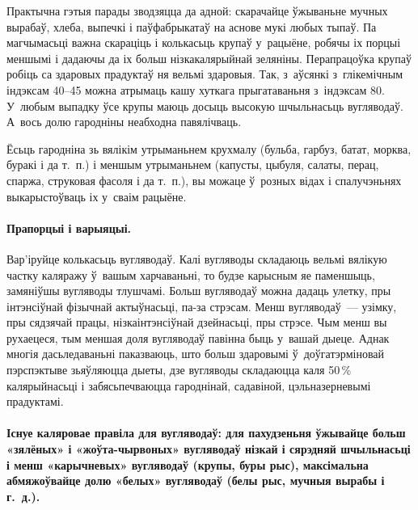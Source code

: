 
Практычна гэтыя парады зводзяцца да адной: скарачайце ўжываньне мучных вырабаў, хлеба, выпечкі і паўфабрыкатаў на аснове мукі любых тыпаў. Па магчымасьці важна скараціць і колькасьць крупаў у~рацыёне, робячы іх порцыі меншымі і дадаючы да іх больш нізкакалярыйнай зеляніны. Перапрацоўка крупаў робіць са здаровых прадуктаў ня вельмі здаровыя. Так, з~аўсянкі з~глікемічным індэксам 40--45 можна атрымаць кашу хуткага прыгатаваньня з~індэксам 80. У~любым выпадку ўсе крупы маюць досыць высокую шчыльнасьць вугляводаў. А~вось долю гародніны неабходна павялічваць.

Ёсьць гародніна зь вялікім утрыманьнем крухмалу (бульба, гарбуз, батат, морква, буракі і да т.~п.) і меншым утрыманьнем (капусты, цыбуля, салаты, перац, спаржа, струковая фасоля і да т.~п.), вы можаце ў~розных відах і спалучэньнях выкарыстоўваць іх у~сваім рацыёне.

\paragraph{Прапорцыі і варыяцыі.}

Вар'іруйце колькасьць вугляводаў. Калі вугляводы складаюць вельмі вялікую частку каляражу ў~вашым харчаваньні, то будзе карысным яе паменшыць, замяніўшы вугляводы тлушчамі. Больш вугляводаў можна дадаць улетку, пры інтэнсіўнай фізычнай актыўнасьці, па-за стрэсам. Менш вугляводаў~--- узімку, пры сядзячай працы, нізкаінтэнсіўнай дзейнасьці, пры стрэсе. Чым менш вы рухаецеся, тым меншая доля вугляводаў павінна быць у~вашай дыеце. Аднак многія дасьледаваньні паказваюць, што больш здаровымі ў~доўгатэрміновай пэрспэктыве зьяўляюцца дыеты, дзе вугляводы складаюцца каля 50\,\% калярыйнасьці і забясьпечваюцца гароднінай, садавіной, цэльназерневымі прадуктамі.

\paragraph{Існуе каляровае правіла для вугляводаў: для пахудзеньня ўжывайце больш «зялёных» і «жоўта-чырвоных» вугляводаў нізкай і сярэдняй шчыльнасьці і менш «карычневых» вугляводаў (крупы, буры рыс), максімальна абмяжоўвайце долю «белых» вугляводаў (белы рыс, мучныя вырабы і г.~д.).}

